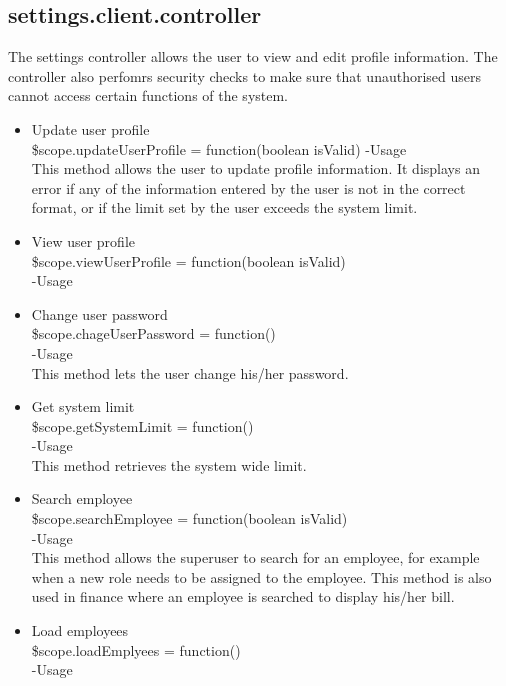 \documentclass[a4paper,12pt]{article}
\begin{document}
 \subsection{settings.client.controller}
 The settings controller allows the user to view and edit profile information. The controller also perfomrs security checks to make sure that unauthorised users cannot access certain functions of the system. 
 \begin{itemize}
 \item Update user profile\\
 \$scope.updateUserProfile = function(boolean isValid)
 -Usage\\
 This method allows the user to update profile information. It displays an error if any of the information entered by the user is not in the correct format, or if the limit set by the user exceeds the system limit.
\item View user profile\\
 \$scope.viewUserProfile = function(boolean isValid)\\
-Usage\\

\item Change user password\\
 \$scope.chageUserPassword = function()\\
-Usage\\
This method lets the user change his/her password.

\item Get system limit\\
 \$scope.getSystemLimit = function()\\
-Usage\\
This method retrieves the system wide limit.

\item Search employee\\
 \$scope.searchEmployee = function(boolean isValid)\\
-Usage\\
This method allows the superuser to search for an employee, for example when a new role needs to be assigned to the employee.
This method is also used in finance where an employee is searched to display his/her bill.

\item Load employees\\
 \$scope.loadEmplyees = function()\\
-Usage\\


\end{itemize}
\end{document}
